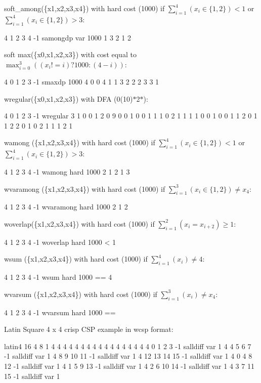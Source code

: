 \documentclass{article}
\begin{document}
\begin{DoxyItemize}
\item soft\-\_\-among(\{x1,x2,x3,x4\}) with hard cost (1000) if $\sum_{i=1}^4(x_i \in \{1,2\}) < 1$ or $\sum_{i=1}^4(x_i \in \{1,2\}) > 3$\-:
\begin{DoxyCode}
4 1 2 3 4 -1 samongdp var 1000 1 3 2 1 2 
\end{DoxyCode}

\item soft max(\{x0,x1,x2,x3\}) with cost equal to $\max_{i=0}^3((x_i!=i)?1000:(4-i))$\-:
\begin{DoxyCode}
4 0 1 2 3 -1 smaxdp 1000 4 0 0 4 1 1 3 2 2 2 3 3 1 
\end{DoxyCode}

\item wregular(\{x0,x1,x2,x3\}) with D\-F\-A (0(10)$\ast$2$\ast$)\-:
\begin{DoxyCode}
4 0 1 2 3 -1 wregular 3 1 0 0 1 2 0 9 0 0 1 0 0 1 1 1 0 2 1 1 1 1 0 0 1 0 0 1 1 2 0 1 1 2 2 0 1 0 2 1 1 1 2
       1 
\end{DoxyCode}

\item wamong (\{x1,x2,x3,x4\}) with hard cost (1000) if $\sum_{i=1}^4(x_i \in \{1,2\}) < 1$ or $\sum_{i=1}^4(x_i \in \{1,2\}) > 3$\-:
\begin{DoxyCode}
4 1 2 3 4 -1 wamong hard 1000 2 1 2 1 3 
\end{DoxyCode}

\item wvaramong (\{x1,x2,x3,x4\}) with hard cost (1000) if $\sum_{i=1}^3(x_i \in \{1,2\}) \neq x_4$\-:
\begin{DoxyCode}
4 1 2 3 4 -1 wvaramong hard 1000 2 1 2 
\end{DoxyCode}

\item woverlap(\{x1,x2,x3,x4\}) with hard cost (1000) if $\sum_{i=1}^2(x_i = x_{i+2}) \geq 1$\-:
\begin{DoxyCode}
4 1 2 3 4 -1 woverlap hard 1000 < 1
\end{DoxyCode}

\item wsum (\{x1,x2,x3,x4\}) with hard cost (1000) if $\sum_{i=1}^4(x_i) \neq 4$\-:
\begin{DoxyCode}
4 1 2 3 4 -1 wsum hard 1000 == 4 
\end{DoxyCode}

\item wvarsum (\{x1,x2,x3,x4\}) with hard cost (1000) if $\sum_{i=1}^3(x_i) \neq x_4$\-:
\begin{DoxyCode}
4 1 2 3 4 -1 wvarsum hard 1000 == 
\end{DoxyCode}

\end{DoxyItemize}Latin Square 4 x 4 crisp C\-S\-P example in wcsp format\-: 
\begin{DoxyCode}
latin4 16 4 8 1
4 4 4 4 4 4 4 4 4 4 4 4 4 4 4 4
4 0 1 2 3 -1 salldiff var 1
4 4 5 6 7 -1 salldiff var 1
4 8 9 10 11 -1 salldiff var 1
4 12 13 14 15 -1 salldiff var 1
4 0 4 8 12 -1 salldiff var 1
4 1 5 9 13 -1 salldiff var 1
4 2 6 10 14 -1 salldiff var 1
4 3 7 11 15 -1 salldiff var 1
\end{DoxyCode}
\end{document}
